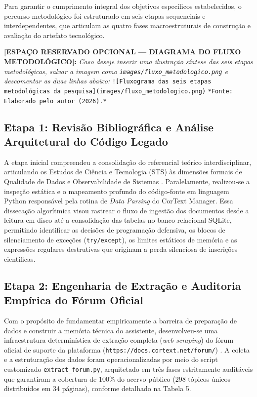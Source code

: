\documentclass[
	oneside,
	a4paper,
	12pt,
	chapter=TITLE,
	section=TITLE,
	english,
	brazilian
]{abntex2}
\begin{document}
Para garantir o cumprimento integral dos objetivos específicos estabelecidos, o percurso metodológico foi estruturado em seis etapas sequenciais e interdependentes, que articulam as quatro fases macroestruturais de construção e avaliação do artefato tecnológico.

\begin{citacao}
\textbf{[ESPAÇO RESERVADO OPCIONAL — DIAGRAMA DO FLUXO METODOLÓGICO]:} \textit{Caso deseje inserir uma ilustração síntese das seis etapas metodológicas, salvar a imagem como \texttt{images/\allowbreak fluxo\_\allowbreak metodologico.\allowbreak png} e descomentar as duas linhas abaixo:} \texttt{![Fluxograma das seis etapas metodológicas da pesquisa](images/\allowbreak fluxo\_\allowbreak metodologico.\allowbreak png)} \texttt{*Fonte: Elaborado pelo autor (2026).*}
\end{citacao}


\FloatBarrier
\subsection{Etapa 1: Revisão Bibliográfica e Análise Arquitetural do Código Legado}\label{sec:etapa_1_revisao_bibliografica_e_analise_}


A etapa inicial compreendeu a consolidação do referencial teórico interdisciplinar, articulando os Estudos de Ciência e Tecnologia (STS) \cite{Latour1987,Bowker1999,Edwards2010,Abdo2021} às dimensões formais de Qualidade de Dados \cite{Wang1996,Naumann2014} e Observabilidade de Sistemas \cite{Majors2022}. Paralelamente, realizou-se a inspeção estática e o mapeamento profundo do código-fonte em linguagem Python responsável pela rotina de \textit{Data Parsing} do CorText Manager. Essa dissecação algorítmica visou rastrear o fluxo de ingestão dos documentos desde a leitura em disco até a consolidação das tabelas no banco relacional SQLite, permitindo identificar as decisões de programação defensiva, os blocos de silenciamento de exceções (\texttt{try/\allowbreak except}), os limites estáticos de memória e as expressões regulares destrutivas que originam a perda silenciosa de inscrições científicas.

\FloatBarrier
\subsection{Etapa 2: Engenharia de Extração e Auditoria Empírica do Fórum Oficial}\label{sec:etapa_2_engenharia_de_extracao_e_auditor}


Com o propósito de fundamentar empiricamente a barreira de preparação de dados e construir a memória técnica do assistente, desenvolveu-se uma infraestrutura determinística de extração completa (\textit{web scraping}) do fórum oficial de suporte da plataforma (\texttt{https://docs.\allowbreak cortext.\allowbreak net/\allowbreak forum/}) \cite{CorText2026,Crawl4AI2026}. A coleta e a estruturação dos dados foram operacionalizadas por meio do script customizado \texttt{extract\_\allowbreak forum.\allowbreak py}, arquitetado em três fases estritamente auditáveis que garantiram a cobertura de 100\% do acervo público (298 tópicos únicos distribuídos em 34 páginas), conforme detalhado na Tabela 5.
\end{document}
